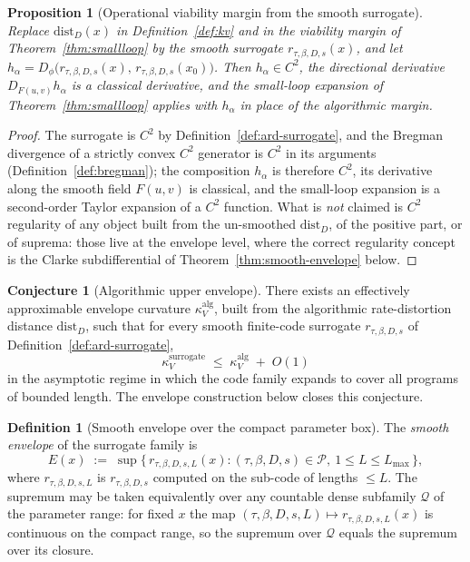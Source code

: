 \documentclass[11pt,a4paper]{article}
\theoremstyle{plain}
\newtheorem{proposition}[theorem]{Proposition}
\theoremstyle{definition}
\newtheorem{definition}[theorem]{Definition}
\newtheorem{conjecture}[theorem]{Conjecture}
\theoremstyle{remark}
\newcommand{\kk}{\kappa_{\!V}}
\newcommand{\distD}{\mathrm{dist}_{D}}
\begin{document}
\begin{proposition}[Operational viability margin from the smooth
surrogate]\label{prop:ard-surrogate}
Replace $\distD(x)$ in Definition~\ref{def:kv} and in the viability
margin of Theorem~\ref{thm:smallloop} by the smooth surrogate
$r_{\tau,\beta,D,s}(x)$, and let $h_\alpha = D_\phi\bigl(
r_{\tau,\beta,D,s}(x),\, r_{\tau,\beta,D,s}(x_0)\bigr)$. Then
$h_\alpha \in C^2$, the directional derivative
$D_{F(u,v)} h_\alpha$ is a classical derivative, and the small-loop
expansion of Theorem~\ref{thm:smallloop} applies with $h_\alpha$ in
place of the algorithmic margin.
\end{proposition}

\begin{proof}
The surrogate is $C^2$ by Definition~\ref{def:ard-surrogate}, and the
Bregman divergence of a strictly convex $C^2$ generator is $C^2$ in
its arguments (Definition~\ref{def:bregman}); the composition
$h_\alpha$ is therefore $C^2$, its derivative along the smooth field
$F(u,v)$ is classical, and the small-loop expansion is a
second-order Taylor expansion of a $C^2$ function. What is
\emph{not} claimed is $C^2$ regularity of any object built from the
un-smoothed $\distD$, of the positive part, or of suprema: those
live at the envelope level, where the correct regularity concept is
the Clarke subdifferential of Theorem~\ref{thm:smooth-envelope}
below.
\end{proof}

\begin{conjecture}[Algorithmic upper envelope]
\label{conj:alg-envelope}
There exists an effectively approximable envelope curvature
$\kk^{\mathrm{alg}}$, built from the algorithmic rate-distortion
distance $\distD$, such that for every smooth finite-code surrogate
$r_{\tau,\beta,D,s}$ of Definition~\ref{def:ard-surrogate},
\[
  \kk^{\mathrm{surrogate}} \;\leq\; \kk^{\mathrm{alg}} \;+\; O(1)
\]
in the asymptotic regime in which the code family expands to cover
all programs of bounded length. The envelope construction below
closes this conjecture.
\end{conjecture}

\begin{definition}[Smooth envelope over the compact parameter box]
\label{def:smooth-envelope}
The \emph{smooth envelope} of the surrogate family is
\begin{equation}\label{eq:smooth-envelope}
  E(x) \;:=\; \sup \bigl\{\, r_{\tau,\beta,D,s,L}(x) :
  (\tau, \beta, D, s) \in \mathcal{P},\ 1 \le L \le L_{\max}
  \,\bigr\},
\end{equation}
where $r_{\tau,\beta,D,s,L}$ is $r_{\tau,\beta,D,s}$ computed on the
sub-code of lengths $\le L$. The supremum may be taken equivalently
over any countable dense subfamily $\mathcal{Q}$ of the parameter
range: for fixed $x$ the map $(\tau,\beta,D,s,L) \mapsto
r_{\tau,\beta,D,s,L}(x)$ is continuous on the compact range, so the
supremum over $\mathcal{Q}$ equals the supremum over its closure.
\end{definition}
\end{document}
